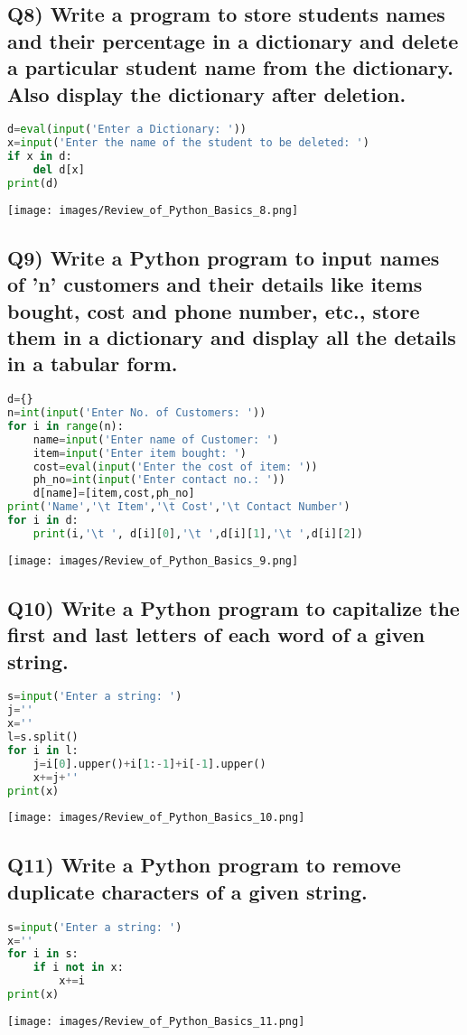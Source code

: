 \documentclass{article}
\begin{document}
\subsection*{Q8) Write a program to store students names and their percentage in a dictionary and delete a particular student name from the dictionary. Also display the dictionary after deletion.}
\begin{lstlisting}[language=Python]
d=eval(input('Enter a Dictionary: '))
x=input('Enter the name of the student to be deleted: ')
if x in d:
    del d[x]
print(d)
\end{lstlisting}
\texttt{[image: images/Review\_of\_Python\_Basics\_8.png]}

\subsection*{Q9) Write a Python program to input names of 'n' customers and their details like items bought, cost and phone number, etc., store them in a dictionary and display all the details in a tabular form.}
\begin{lstlisting}[language=Python]
d={}
n=int(input('Enter No. of Customers: '))
for i in range(n):
    name=input('Enter name of Customer: ')
    item=input('Enter item bought: ')
    cost=eval(input('Enter the cost of item: '))
    ph_no=int(input('Enter contact no.: '))
    d[name]=[item,cost,ph_no]
print('Name','\t Item','\t Cost','\t Contact Number')
for i in d:
    print(i,'\t ', d[i][0],'\t ',d[i][1],'\t ',d[i][2])
\end{lstlisting}
\texttt{[image: images/Review\_of\_Python\_Basics\_9.png]}

\subsection*{Q10) Write a Python program to capitalize the first and last letters of each word of a given string.}
\begin{lstlisting}[language=Python]
s=input('Enter a string: ')
j=''
x=''
l=s.split()
for i in l:
    j=i[0].upper()+i[1:-1]+i[-1].upper()
    x+=j+''
print(x)
\end{lstlisting}
\texttt{[image: images/Review\_of\_Python\_Basics\_10.png]}

\subsection*{Q11) Write a Python program to remove duplicate characters of a given string.}
\begin{lstlisting}[language=Python]
s=input('Enter a string: ')
x=''
for i in s:
    if i not in x:
        x+=i
print(x)
\end{lstlisting}
\texttt{[image: images/Review\_of\_Python\_Basics\_11.png]}
\end{document}

